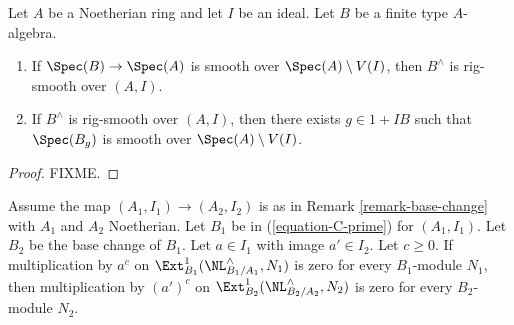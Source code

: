 \begin{lemma}
\label{lemma-rig-smooth}
Let $A$ be a Noetherian ring and let $I$ be an ideal.
Let $B$ be a finite type $A$-algebra.
\begin{enumerate}
\item If $\Spec(B) \to \Spec(A)$ is smooth over $\Spec(A) \setminus V(I)$,
then $B^\wedge$ is rig-smooth over $(A, I)$.
\item If $B^\wedge$ is rig-smooth over $(A, I)$,
then there exists $g \in 1 + IB$ such that $\Spec(B_g)$ is smooth
over $\Spec(A) \setminus V(I)$.
\end{enumerate}
\end{lemma}

\begin{proof}
FIXME.
\end{proof}

\begin{lemma}
\label{lemma-zero-after-modding-out-better}
Assume the map $(A_1, I_1) \to (A_2, I_2)$ is as in
Remark \ref{remark-base-change} with $A_1$ and $A_2$ Noetherian.
Let $B_1$ be in (\ref{equation-C-prime}) for $(A_1, I_1)$.
Let $B_2$ be the base change of $B_1$. Let $a \in I_1$ with
image $a' \in I_2$. Let $c \geq 0$. If multiplication by $a^c$ on
$\Ext^1_{B_1}(\NL^\wedge_{B_1/A_1}, N_1)$
is zero for every $B_1$-module $N_1$, then multiplication by
$(a')^c$ on $\Ext^1_{B_2}(\NL^\wedge_{B_2/A_2}, N_2)$
is zero for every $B_2$-module $N_2$.
\end{lemma}

